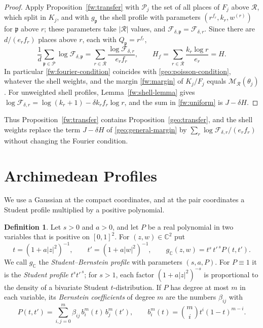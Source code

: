 \documentclass[11pt]{amsart}
\numberwithin{equation}{section}
\theoremstyle{definition}
\newtheorem{definition}[equation]{Definition}
\theoremstyle{remark}
\newcommand{\C}{\mathbb C}
\begin{document}
\begin{proof}
Apply Proposition~\ref{fw:transfer} with $\mathcal P_j$ the set of all
places of $F_j$ above $\mathcal R$, which split in $K_j$, and with
$g_{\mathfrak p}$ the shell profile with parameters
$(r^{f_r},k_r,w^{(r)})$ for $\mathfrak p$ above $r$; these parameters
take $|\mathcal R|$ values, and $\mathcal F_{\delta,\mathfrak
p}=\mathcal F_{\delta,r}$. Since there are $d/(e_rf_r)$ places above
$r$, each with $Q_{\mathfrak p}=r^{f_r}$,
\begin{equation}\label{fw:uniform}
 \frac1d\sum_{\mathfrak p\in\mathcal P}\log\mathcal F_{\delta,\mathfrak p}
 =\sum_{r\in\mathcal R}\frac{\log\mathcal F_{\delta,r}}{e_rf_r},
 \qquad
 H_f=\sum_{r\in\mathcal R}\frac{k_r\log r}{e_r}=H .
\end{equation}
In particular \eqref{fw:fourier-condition} coincides with
\eqref{geo:poisson-condition}, whatever the shell weights, and the
margin \eqref{fw:margin} of $K_j/F_j$ equals $\mathcal M_{\mathcal
R}(\theta_j)$. For unweighted shell profiles, Lemma~\ref{fw:shell-lemma}
gives $\log\mathcal F_{\delta,r}=\log(k_r+1)-\delta k_rf_r\log r$, and the
sum in \eqref{fw:uniform} is $J-\delta H$.
\end{proof}

Thus Proposition~\ref{fw:transfer} contains
Proposition~\ref{geo:transfer}, and the shell weights replace the term
$J-\delta H$ of \eqref{geo:general-margin} by
$\sum_r\log\mathcal F_{\delta,r}/(e_rf_r)$ without changing the Fourier
condition.
\section{Archimedean Profiles}
\label{pf:section}

We use a Gaussian at the compact coordinates, and at the pair
coordinates a Student profile multiplied by a positive polynomial.

\begin{definition}\label{pf:student}
Let $s>0$ and $a>0$, and let $P$ be a real polynomial in two variables
that is positive on $[0,1]^2$. For $(z,w)\in\C^2$ put
\[
 t=(1+a|z|^2)^{-1},\qquad t'=(1+a|w|^2)^{-1},\qquad
 g_\C(z,w)=t^s\,t'^{\,s}P(t,t').
\]
We call $g_\C$ the \emph{Student--Bernstein profile} with parameters
$(s,a,P)$. For $P\equiv1$ it is the \emph{Student profile}
$t^st'^{\,s}$; for $s>1$, each factor $(1+a|z|^2)^{-s}$ is proportional
to the density of a bivariate Student $t$-distribution. If $P$ has
degree at most $m$ in each variable, its \emph{Bernstein coefficients}
of degree $m$ are the numbers $\beta_{ij}$ with
\[
 P(t,t')=\sum_{i,j=0}^m\beta_{ij}\,b_i^m(t)\,b_j^m(t'),\qquad
 b_i^m(t)=\binom mi t^i(1-t)^{m-i}.
\]
\end{definition}
\end{document}
